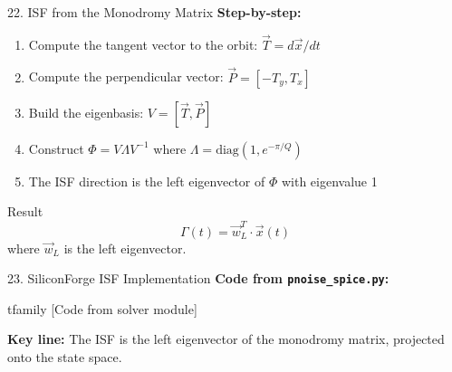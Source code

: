 \documentclass[aspectratio=169, 11pt]{beamer}
\begin{document}
\begin{frame}{22. ISF from the Monodromy Matrix}
    \textbf{Step-by-step:}

    \vspace{0.5em}
    \begin{enumerate}
        \item Compute the tangent vector to the orbit: $\vec{T} = d\vec{x}/dt$
        \item Compute the perpendicular vector: $\vec{P} = [-T_y, T_x]$
        \item Build the eigenbasis: $V = [\vec{T}, \vec{P}]$
        \item Construct $\Phi = V \Lambda V^{-1}$ where $\Lambda = \text{diag}(1, e^{-\pi/Q})$
        \item The ISF direction is the left eigenvector of $\Phi$ with eigenvalue 1
    \end{enumerate}

    \vspace{0.5em}
    \begin{block}{Result}
        \[ \Gamma(t) = \vec{w}_L^T \cdot \vec{x}(t) \]
        where $\vec{w}_L$ is the left eigenvector.
    \end{block}
\end{frame}

\begin{frame}{23. SiliconForge ISF Implementation}
    \textbf{Code from \texttt{pnoise\_spice.py}:}

    \vspace{0.5em}
    {	tfamily [Code from solver module]}

    \vspace{0.5em}
    \textbf{Key line:} The ISF is the left eigenvector of the monodromy matrix, projected onto the state space.
\end{frame}
\end{document}
